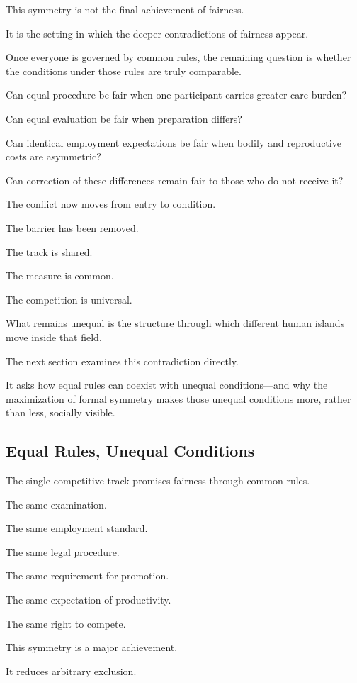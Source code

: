 This symmetry is not the final achievement of fairness.

It is the setting in which the deeper contradictions of fairness appear.

Once everyone is governed by common rules, the remaining question is whether the conditions under those rules are truly comparable.

Can equal procedure be fair when one participant carries greater care burden?

Can equal evaluation be fair when preparation differs?

Can identical employment expectations be fair when bodily and reproductive costs are asymmetric?

Can correction of these differences remain fair to those who do not receive it?

The conflict now moves from entry to condition.

The barrier has been removed.

The track is shared.

The measure is common.

The competition is universal.

What remains unequal is the structure through which different human islands move inside that field.

The next section examines this contradiction directly.

It asks how equal rules can coexist with unequal conditions—and why the maximization of formal symmetry makes those unequal conditions more, rather than less, socially visible.

\subsection*{\textbf{Equal Rules, Unequal Conditions}}

The single competitive track promises fairness through common rules.

The same examination.

The same employment standard.

The same legal procedure.

The same requirement for promotion.

The same expectation of productivity.

The same right to compete.

This symmetry is a major achievement.

It reduces arbitrary exclusion.

